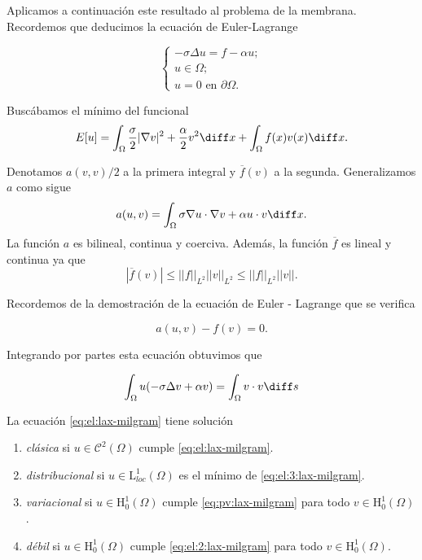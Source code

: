 \documentclass{article}
\begin{document}
\begin{ex}
  Aplicamos a continuación este resultado al problema de la membrana. Recordemos que deducimos la
  ecuación de Euler-Lagrange

  
  \begin{equation}
    \label{eq:el:lax-milgram}
    \begin{cases}
      - \sigma \Delta u = f - \alpha u; \\
      u \in \Omega; \\
      u = 0 \text{ en } \partial \Omega.
    \end{cases}
  \end{equation}

  Buscábamos el mínimo del funcional
  \begin{equation}
    \label{eq:pv:lax-milgram}
    E[u] = \int_{\Omega} \frac{\sigma}{2}|\nabla v|^2 + \frac{\alpha}{2}v^2 \diff x + \int_{\Omega}
    f(x) v(x) \diff x.
  \end{equation}

  Denotamos $a(v,v)/2$ a la primera integral y $\overline{f}(v)$ a la segunda. Generalizamos $a$
  como sigue
  \[ a(u,v) = \int_{\Omega} \sigma\nabla u \cdot \nabla v + \alpha u \cdot v \diff x.\] La función
  $a$ es bilineal, continua y coerciva. Además, la función $\overline{f}$ es lineal y continua ya
  que
  \[ | \overline{f}(v) | \le ||f ||_{L^2} ||v||_{L^2} \le ||f ||_{L^2} ||v||. \]

  Recordemos de la demostración de la ecuación de Euler - Lagrange que se verifica
  
  \begin{equation}
    \label{eq:el:2:lax-milgram}
    a(u,v) - f(v) = 0.
  \end{equation}

  Integrando por partes esta ecuación obtuvimos que

  \begin{equation} \label{eq:el:3:lax-milgram} \int_{\Omega} u(-\sigma \Delta v + \alpha v) =
    \int_{\Omega} v \cdot v \diff s
  \end{equation}
\end{ex}

\begin{definition}
  La ecuación \eqref{eq:el:lax-milgram} tiene solución
  
  \begin{enumerate}
  \item \emph{clásica} si $u \in \mathcal{C}^2(\Omega)$ cumple \eqref{eq:el:lax-milgram}.
  \item \emph{distribucional} si $u \in \mathrm{L}_{loc}^1(\Omega)$ es el mínimo de
    \eqref{eq:el:3:lax-milgram}.
  \item \emph{variacional} si $u \in \mathrm{H}_{0}^1(\Omega)$ cumple \eqref{eq:pv:lax-milgram} para
    todo $v \in \mathrm{H}_0^1(\Omega)$.
  \item \emph{débil} si $u \in \mathrm{H}_{0}^1(\Omega)$ cumple \eqref{eq:el:2:lax-milgram} para
    todo $v \in \mathrm{H}_0^1(\Omega)$.
  \end{enumerate}
\end{definition}
\end{document}
